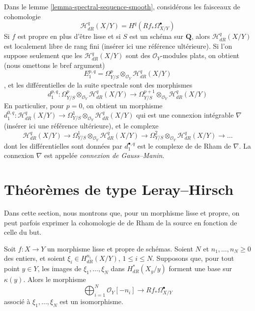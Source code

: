 \begin{remark}
\label{remark-gauss-manin}
Dans le lemme \ref{lemma-spectral-sequence-smooth}, considérons les faisceaux de cohomologie
$$
\mathcal{H}^q_{dR}(X/Y) = H^q(Rf_*\Omega^\bullet_{X/Y})
$$
Si $f$ est propre en plus d'être lisse et si $S$ est un schéma sur
$\mathbf{Q}$, alors $\mathcal{H}^q_{dR}(X/Y)$ est localement libre de rang fini (insérer
ici une référence ultérieure). Si l'on suppose seulement que les $\mathcal{H}^q_{dR}(X/Y)$
sont des $\mathcal{O}_Y$-modules plats, on obtient (nous omettons le bref argument)
$$
E_1^{p, q} =
\Omega^p_{Y/S} \otimes_{\mathcal{O}_Y} \mathcal{H}^q_{dR}(X/Y)
$$,
et les différentielles de la suite spectrale sont des morphismes
$$
d_1^{p, q} :
\Omega^p_{Y/S} \otimes_{\mathcal{O}_Y} \mathcal{H}^q_{dR}(X/Y)
\longrightarrow
\Omega^{p + 1}_{Y/S} \otimes_{\mathcal{O}_Y} \mathcal{H}^q_{dR}(X/Y)
$$
En particulier, pour $p = 0$, on obtient un morphisme
$d_1^{0, q} : \mathcal{H}^q_{dR}(X/Y) \to
\Omega^1_{Y/S} \otimes_{\mathcal{O}_Y} \mathcal{H}^q_{dR}(X/Y)$
qui est une connexion intégrable
$\nabla$ (insérer ici une référence ultérieure),
et le complexe
$$
\mathcal{H}^q_{dR}(X/Y) \to
\Omega^1_{Y/S} \otimes_{\mathcal{O}_Y} \mathcal{H}^q_{dR}(X/Y) \to
\Omega^2_{Y/S} \otimes_{\mathcal{O}_Y} \mathcal{H}^q_{dR}(X/Y) \to \ldots
$$
dont les différentielles sont données par $d_1^{\bullet, q}$
est le complexe de de Rham de $\nabla$.
La connexion $\nabla$ est appelée {\it connexion de Gauss--Manin}.
\end{remark}






\section{Théorèmes de type Leray--Hirsch}
\label{section-leray-hirsch}

\noindent
Dans cette section, nous montrons que, pour un morphisme lisse et propre,
on peut parfois exprimer la cohomologie de de Rham de la source en fonction
de celle du but.

\begin{lemma}
\label{lemma-relative-global-generation-on-fibres}
Soit $f : X \to Y$ un morphisme lisse et propre de schémas.
Soient $N$ et $n_1, \ldots, n_N \geq 0$ des entiers, et soient
$\xi_i \in H^{n_i}_{dR}(X/Y)$, $1 \leq i \leq N$.
Supposons que, pour tout point $y \in Y$, les images de $\xi_1, \ldots, \xi_N$
dans $H^*_{dR}(X_y/y)$ forment une base sur $\kappa(y)$. Alors le morphisme
$$
\bigoplus\nolimits_{i = 1}^N \mathcal{O}_Y[-n_i]
\longrightarrow
Rf_*\Omega^\bullet_{X/Y}
$$
associé à $\xi_1, \ldots, \xi_N$ est un isomorphisme.
\end{lemma}

